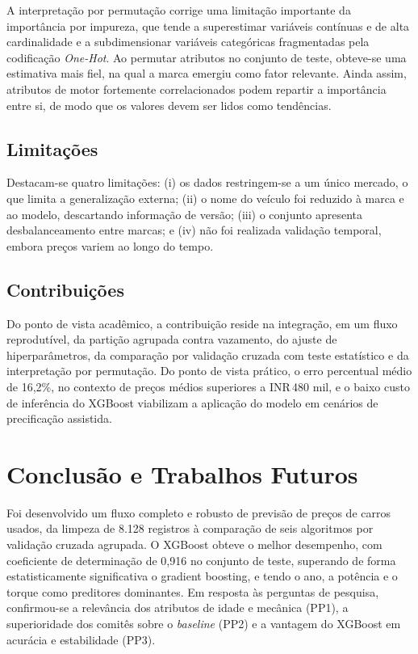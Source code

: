 \documentclass[conference]{IEEEtran}
\begin{document}
A interpretação por permutação corrige uma limitação importante da importância por impureza, que tende a superestimar variáveis contínuas e de alta cardinalidade e a subdimensionar variáveis categóricas fragmentadas pela codificação \textit{One-Hot}. Ao permutar atributos no conjunto de teste, obteve-se uma estimativa mais fiel, na qual a marca emergiu como fator relevante. Ainda assim, atributos de motor fortemente correlacionados podem repartir a importância entre si, de modo que os valores devem ser lidos como tendências.

\subsection{Limitações}
Destacam-se quatro limitações: (i) os dados restringem-se a um único mercado, o que limita a generalização externa; (ii) o nome do veículo foi reduzido à marca e ao modelo, descartando informação de versão; (iii) o conjunto apresenta desbalanceamento entre marcas; e (iv) não foi realizada validação temporal, embora preços variem ao longo do tempo.

\subsection{Contribuições}
Do ponto de vista acadêmico, a contribuição reside na integração, em um fluxo reprodutível, da partição agrupada contra vazamento, do ajuste de hiperparâmetros, da comparação por validação cruzada com teste estatístico e da interpretação por permutação. Do ponto de vista prático, o erro percentual médio de 16,2\%, no contexto de preços médios superiores a INR\,480 mil, e o baixo custo de inferência do XGBoost viabilizam a aplicação do modelo em cenários de precificação assistida.

\section{Conclusão e Trabalhos Futuros}
Foi desenvolvido um fluxo completo e robusto de previsão de preços de carros usados, da limpeza de 8.128 registros à comparação de seis algoritmos por validação cruzada agrupada. O XGBoost obteve o melhor desempenho, com coeficiente de determinação de 0,916 no conjunto de teste, superando de forma estatisticamente significativa o gradient boosting, e tendo o ano, a potência e o torque como preditores dominantes. Em resposta às perguntas de pesquisa, confirmou-se a relevância dos atributos de idade e mecânica (PP1), a superioridade dos comitês sobre o \textit{baseline} (PP2) e a vantagem do XGBoost em acurácia e estabilidade (PP3).
\end{document}
